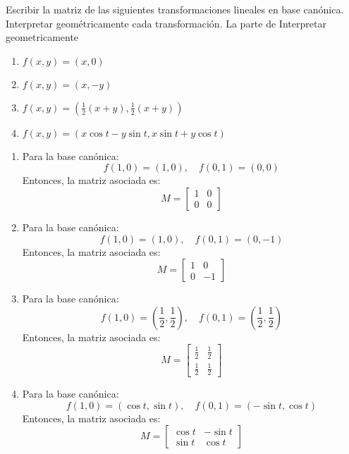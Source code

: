 \begin{enunciado}{\ejercicio}
    Escribir la matriz de las siguientes transformaciones lineales en base canónica.
Interpretar geométricamente cada transformación. \newline
La parte de Interpretar geometricamente \hacer 
    \begin{enumerate}[label=(\alph*)]
    \item \( f(x,y) = (x,0) \)
    \item \( f(x,y) = (x,-y) \)
    \item \( f(x,y) = \left( \frac{1}{2} (x + y), \frac{1}{2} (x + y) \right) \)
    \item \( f(x,y) = (x \cos t - y \sin t, x \sin t + y \cos t) \)
    
    \end{enumerate}
  \end{enunciado}
  
  \begin{enumerate}[label=(\alph*)]
    \item Para la base canónica:
    \[
    f(1,0) = (1,0), \quad f(0,1) = (0,0)
    \]
    Entonces, la matriz asociada es:
    \[
    M =
    \begin{bmatrix}
    1 & 0 \\
    0 & 0
    \end{bmatrix}
    \]
   
    \item Para la base canónica:
    \[
    f(1,0) = (1,0), \quad f(0,1) = (0,-1)
    \]
    Entonces, la matriz asociada es:
    \[
    M =
    \begin{bmatrix}
    1 & 0 \\
    0 & -1
    \end{bmatrix}
    \]

    \item Para la base canónica:
    \[
    f(1,0) = \left( \frac{1}{2}, \frac{1}{2} \right), \quad f(0,1) = \left( \frac{1}{2}, \frac{1}{2} \right)
    \]
    Entonces, la matriz asociada es:
    \[
    M =
    \begin{bmatrix}
    \frac{1}{2} & \frac{1}{2} \\
    \frac{1}{2} & \frac{1}{2}
    \end{bmatrix}
    \]

    \item Para la base canónica:
    \[
    f(1,0) = (\cos t, \sin t), \quad f(0,1) = (-\sin t, \cos t)
    \]
    Entonces, la matriz asociada es:
    \[
    M =
    \begin{bmatrix}
    \cos t & -\sin t \\
    \sin t & \cos t
    \end{bmatrix}
    \]
  
  \end{enumerate}
  
  \begin{aportes}
    \item {} 
  \end{aportes}